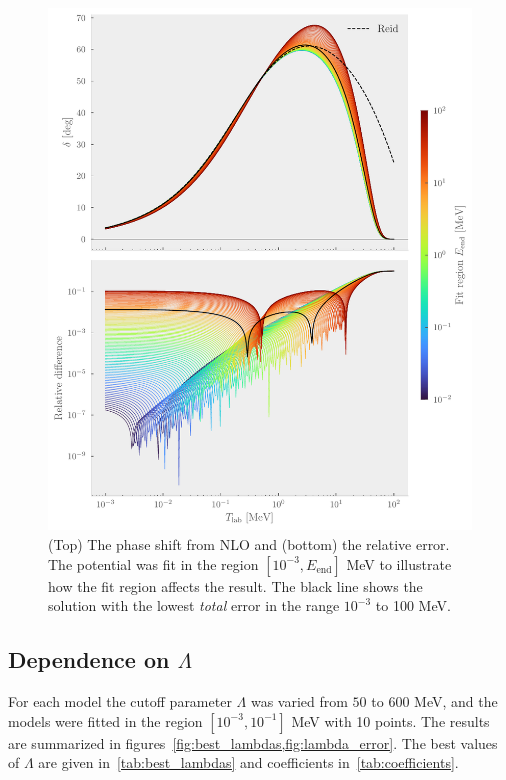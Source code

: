 \begin{figure}[pt]
  \centering
  \includegraphics{Figures/NLO_region_error.pdf}
  \caption{\label{fig:NLO_region_error} (Top) The phase shift from NLO and
    (bottom) the relative error. The potential was fit in the region \([10^{-3},
    E_{\mathrm{end}}]\) MeV to illustrate how the fit region affects the result.
    The black line shows the solution with the lowest \textit{total} error in
    the range \(10^{-3}\) to 100 MeV.}
\end{figure}

\FloatBarrier

\subsection{Dependence on \texorpdfstring{\(\Lambda\)}{cutoff}}

For each model the cutoff parameter \(\Lambda\) was varied from \(50\) to
\(600\) MeV, and the models were fitted in the region \([10^{-3},
10^{-1}]\) MeV with 10 points. The results are summarized in
figures~\cref{fig:best_lambdas,fig:lambda_error}. The best values of \(\Lambda\)
are given in~\cref{tab:best_lambdas} and coefficients in~\cref{tab:coefficients}.

